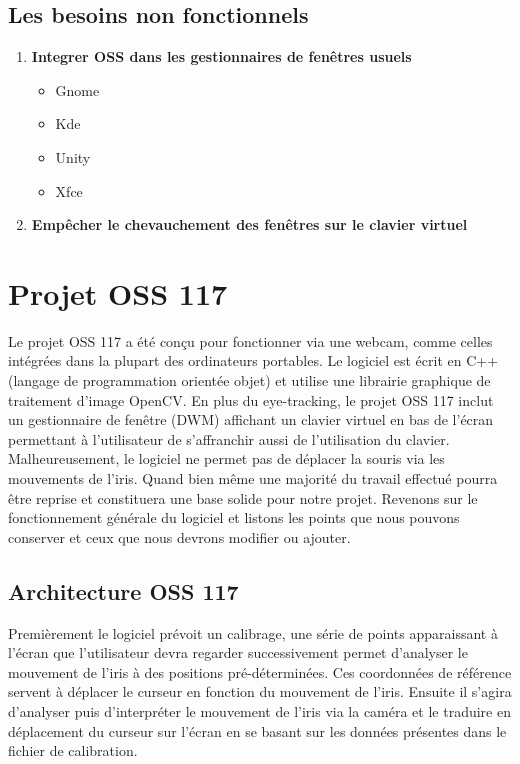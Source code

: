 \documentclass[a4paper, 12pt]{report}
\begin{document}
        \section{Les besoins non fonctionnels}
\begin{enumerate}
\item \textbf{Integrer OSS dans les gestionnaires de fenêtres usuels}
\begin{itemize}
\item Gnome
\item Kde
\item Unity
\item Xfce
\end{itemize}
\item \textbf{Empêcher le chevauchement des fenêtres sur le clavier virtuel}
\end{enumerate}
\chapter{Projet OSS 117}
    Le projet OSS 117 a été conçu pour fonctionner via une webcam, comme celles intégrées dans la plupart des ordinateurs portables. Le logiciel est écrit en C++\cite{c8} (langage de programmation orientée objet) et utilise une librairie graphique de traitement d'image OpenCV. En plus du eye-tracking, le projet OSS 117 inclut un gestionnaire de fenêtre (DWM) affichant un clavier virtuel en bas de l'écran permettant à l'utilisateur de s'affranchir aussi de l'utilisation du clavier. Malheureusement, le logiciel ne permet pas de déplacer la souris via les mouvements de l'iris. Quand bien même une majorité du travail effectué pourra être reprise et constituera une base solide pour notre projet. Revenons sur le fonctionnement générale du logiciel et listons les points que nous pouvons conserver et ceux que nous devrons modifier ou ajouter.
    
    	\section{Architecture OSS 117}
        Premièrement le logiciel prévoit un calibrage, une série de points apparaissant à l'écran que l'utilisateur devra regarder successivement permet d'analyser le mouvement	 de l'iris à des positions pré-déterminées. Ces coordonnées de référence servent à déplacer le curseur en fonction du mouvement de l'iris. Ensuite il s'agira d'analyser puis d'interpréter le mouvement de l'iris via la caméra et le traduire en déplacement du curseur sur l'écran en se basant sur les données présentes dans le fichier de calibration. \\
        
\end{document}

